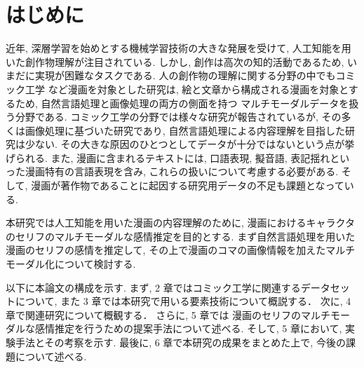\newpage
\changeindent{0cm}
\section{はじめに}
\changeindent{2cm}
近年, 深層学習を始めとする機械学習技術の大きな発展を受けて, 人工知能を用いた創作物理解が注目されている.
しかし, 創作は高次の知的活動であるため, いまだに実現が困難なタスクである.
人の創作物の理解に関する分野の中でもコミック工学 \cite{comic} など漫画を対象とした研究は,
絵と文章から構成される漫画を対象とするため, 自然言語処理と画像処理の両方の側面を持つ
マルチモーダルデータを扱う分野である.
コミック工学の分野では様々な研究が報告されているが,
その多くは画像処理に基づいた研究であり,
自然言語処理による内容理解を目指した研究は少ない.
その大きな原因のひとつとしてデータが十分ではないという点が挙げられる.
また, 漫画に含まれるテキストには, 口語表現, 擬音語, 表記揺れといった漫画特有の言語表現を含み,
これらの扱いについて考慮する必要がある.
そして, 漫画が著作物であることに起因する研究用データの不足も課題となっている.

本研究では人工知能を用いた漫画の内容理解のために,
漫画におけるキャラクタのセリフのマルチモーダルな感情推定を目的とする.
まず自然言語処理を用いた漫画のセリフの感情を推定して,
その上で漫画のコマの画像情報を加えたマルチモーダル化について検討する.

以下に本論文の構成を示す.
まず, 2 章ではコミック工学に関連するデータセットについて,
また 3 章では本研究で用いる要素技術について概説する．
次に, 4 章で関連研究について概観する．
さらに, 5 章では
漫画のセリフのマルチモーダルな感情推定を行うための提案手法について述べる.
そして, 5 章において, 実験手法とその考察を示す.
最後に, 6 章で本研究の成果をまとめた上で, 今後の課題について述べる.

